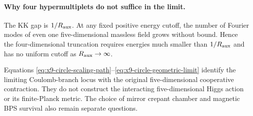 \paragraph{Why four hypermultiplets do not suffice in the limit.}
The KK gap is $1/R_{\rm aux}$. At any fixed positive energy cutoff,
the number of Fourier modes of even one five-dimensional massless
field grows without bound. Hence the four-dimensional truncation
requires energies much smaller than $1/R_{\rm aux}$ and has no
uniform cutoff as $R_{\rm aux}\to\infty$.

Equations \eqref{eq:x9-circle-scaling-path}--\eqref{eq:x9-circle-geometric-limit}
identify the limiting Coulomb-branch locus with the original
five-dimensional cooperative contraction. They do not construct
the interacting five-dimensional Higgs action or its finite-Planck
metric. The choice of mirror crepant chamber and magnetic BPS
survival also remain separate questions.
